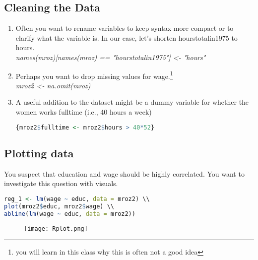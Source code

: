\documentclass[12pt]{article}%
\begin{document}
\subsection {Cleaning the Data}
\begin{enumerate}
\item Often you want to rename variables to keep syntax more compact or to clarify what the variable is. In our case, let's shorten hourstotalin1975 to hours.
\\
\textit{names(mroz)[names(mroz) == "hourstotalin1975"] <- "hours"}
\item Perhaps you want to drop missing values for wage.\footnote{you will learn in this class why this is often not a good idea}
\\
\textit{mroz2 <- na.omit(mroz)}
\\
\item A useful addition to the dataset might be a dummy variable for whether the women works fulltime (i.e., 40 hours a week) \\ 
\begin{lstlisting}[language=R]
{mroz2$fulltime <- mroz2$hours > 40*52}
\end{lstlisting}
\end{enumerate}

\subsection{Plotting data}
You suspect that education and wage should be highly correlated. You want to investigate this question with visuals. 
\\
\begin{lstlisting}[language=R]
reg_1 <- lm(wage ~ educ, data = mroz2) \\
plot(mroz2$educ, mroz2$wage) \\
abline(lm(wage ~ educ, data = mroz2))

\end{lstlisting}



\begin{figure}[h]\centering
\texttt{[image: Rplot.png]}
\end{figure}
\end{document}
